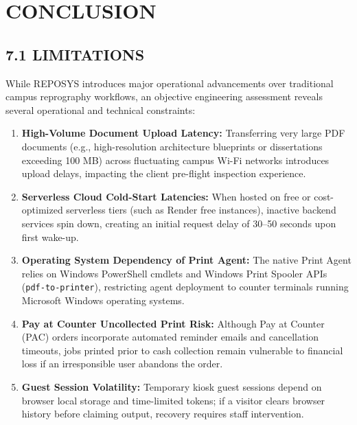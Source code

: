 \documentclass[12pt,a4paper,oneside]{report}
\begin{document}
\chapter{CONCLUSION}

\section{7.1 LIMITATIONS}
While REPOSYS introduces major operational advancements over traditional campus reprography workflows, an objective engineering assessment reveals several operational and technical constraints:
\begin{enumerate}[leftmargin=0.35in, itemsep=2pt]
  \item \textbf{High-Volume Document Upload Latency:} Transferring very large PDF documents (e.g., high-resolution architecture blueprints or dissertations exceeding 100 MB) across fluctuating campus Wi-Fi networks introduces upload delays, impacting the client pre-flight inspection experience.
  \item \textbf{Serverless Cloud Cold-Start Latencies:} When hosted on free or cost-optimized serverless tiers (such as Render free instances), inactive backend services spin down, creating an initial request delay of 30--50 seconds upon first wake-up.
  \item \textbf{Operating System Dependency of Print Agent:} The native Print Agent relies on Windows PowerShell cmdlets and Windows Print Spooler APIs (\texttt{pdf-to-printer}), restricting agent deployment to counter terminals running Microsoft Windows operating systems.
  \item \textbf{Pay at Counter Uncollected Print Risk:} Although Pay at Counter (PAC) orders incorporate automated reminder emails and cancellation timeouts, jobs printed prior to cash collection remain vulnerable to financial loss if an irresponsible user abandons the order.
  \item \textbf{Guest Session Volatility:} Temporary kiosk guest sessions depend on browser local storage and time-limited tokens; if a visitor clears browser history before claiming output, recovery requires staff intervention.
\end{enumerate}
\end{document}
